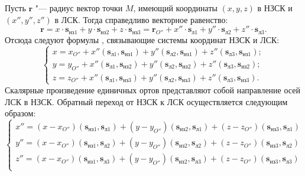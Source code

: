 \documentclass[../main.tex]{subfiles}
\begin{document}
Пусть $\mathbf{r}$ "--- радиус вектор точки $M$, имеющий координаты $\left(x, y, z\right)$ в НЗСК и $\left(x'', y'', z''\right)$ в ЛСК. Тогда справедливо векторное равенство:
\begin{equation*}
  \mathbf{r} = x \cdot \mathbf{s}_{\text{нз}1} + y \cdot \mathbf{s}_{\text{нз}2} + z \cdot \mathbf{s}_{\text{нз}3} =
  \mathbf{r}_{O''} + x'' \cdot \mathbf{s}_{\text{л}1} + y'' \cdot \mathbf{s}_{\text{л}2} +  z'' \cdot \mathbf{s}_{\text{л}3}.
\end{equation*}
Отсюда следуют формулы , связывающие системы координат НЗСК и ЛСК:
\begin{equation}\label{eq:tetrahedron:ncs_to_lcs}
  \begin{cases}
    x = x_{O''} + x'' \left(\mathbf{s}_{\text{л}1}, \mathbf{s}_{\text{нз}1}\right) + y'' \left(\mathbf{s}_{\text{л}2}, \mathbf{s}_{\text{нз}1}\right) + z'' \left(\mathbf{s}_{\text{л}3}, \mathbf{s}_{\text{нз}1}\right); \\
    y = y_{O''} + x'' \left(\mathbf{s}_{\text{л}1}, \mathbf{s}_{\text{нз}2}\right) + y'' \left(\mathbf{s}_{\text{л}2}, \mathbf{s}_{\text{нз}2}\right) + z'' \left(\mathbf{s}_{\text{л}3}, \mathbf{s}_{\text{нз}2}\right); \\
    z = z_{O''} + x'' \left(\mathbf{s}_{\text{л}1}, \mathbf{s}_{\text{нз}3}\right) + y'' \left(\mathbf{s}_{\text{л}2}, \mathbf{s}_{\text{нз}3}\right) + z'' \left(\mathbf{s}_{\text{л}3}, \mathbf{s}_{\text{нз}3}\right).
  \end{cases}
\end{equation}
Скалярные произведение единичных ортов представляют собой направление осей ЛСК в НЗСК. Обратный переход от НЗСК к ЛСК осуществляется следующим образом:
\begin{equation}\label{eq:tetrahedron:lcs_to_ncs}
  \begin{cases}
    x'' = \left(x - x_{O''}\right)\left(\mathbf{s}_{\text{нз}1}, \mathbf{s}_{\text{л}1}\right) + \left(y - y_{O''}\right)\left(\mathbf{s}_{\text{нз}2}, \mathbf{s}_{\text{л}1}\right) + \left(z - z_{O''}\right)\left(\mathbf{s}_{\text{нз}3}, \mathbf{s}_{\text{л}1}\right) \\
    y'' = \left(x - x_{O''}\right)\left(\mathbf{s}_{\text{нз}1}, \mathbf{s}_{\text{л}2}\right) + \left(y - y_{O''}\right)\left(\mathbf{s}_{\text{нз}2}, \mathbf{s}_{\text{л}2}\right) + \left(z - z_{O''}\right)\left(\mathbf{s}_{\text{нз}3}, \mathbf{s}_{\text{л}2}\right) \\
    z'' = \left(x - x_{O''}\right)\left(\mathbf{s}_{\text{нз}1}, \mathbf{s}_{\text{л}3}\right) + \left(y - y_{O''}\right)\left(\mathbf{s}_{\text{нз}2}, \mathbf{s}_{\text{л}3}\right) + \left(z - z_{O''}\right)\left(\mathbf{s}_{\text{нз}3}, \mathbf{s}_{\text{л}3}\right) \\
  \end{cases}
\end{equation}
\end{document}
